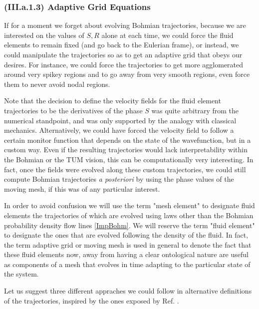 \documentclass[11pt, a4paper]{article} %
\begin{document}
\subsubsection*{(III.a.1.3) Adaptive Grid Equations}
If for a moment we forget about evolving Bohmian trajectories, because we are interested on the values of $S,R$ alone at each time, we could force the fluid elements to remain fixed (and go back to the Eulerian frame), or instead, we could manipulate the trajectories so as to get an adaptive grid that obeys our desires. For instance, we could force the trajectories to get more agglomerated around very spikey regions and to go away from very smooth regions, even force them to never avoid nodal regions.

Note that the decision to define the velocity fields for the fluid element trajectories to be the derivatives of the phase $S$ was quite arbitrary from the numerical standpoint, and was only supported by the analogy with classical mechanics. Alternatively, we could have forced the velocity field to follow a certain monitor function that depends on the state of the wavefunction, but in a custom way. Even if the resulting trajectories would lack interpretability within the Bohmian or the TUM vision, this can be computationally very interesting. In fact, once the fields were evolved along these custom trajectories, we could still compute Bohmian trajectories {\em a posteriori} by using the phase values of the moving mesh, if this was of any particular interest.

In order to avoid confusion we will use the term "mesh element" to designate fluid elements the trajectories of which are evolved using laws other than the Bohmian probability density flow lines \eqref{ImpBohm}. We will reserve the term "fluid element" to designate the ones that are evolved following the density of the fluid. In fact, the term adaptive grid or moving mesh is used in general to denote the fact that these fluid elements now, away from having a clear ontological nature are useful as components of a mesh that evolves in time adapting to the particular state of the system.

Let us suggest three different appraches we could follow in alternative definitions of the trajectories, inspired by the ones exposed by Ref. \cite{Wyatt}.
\end{document}
